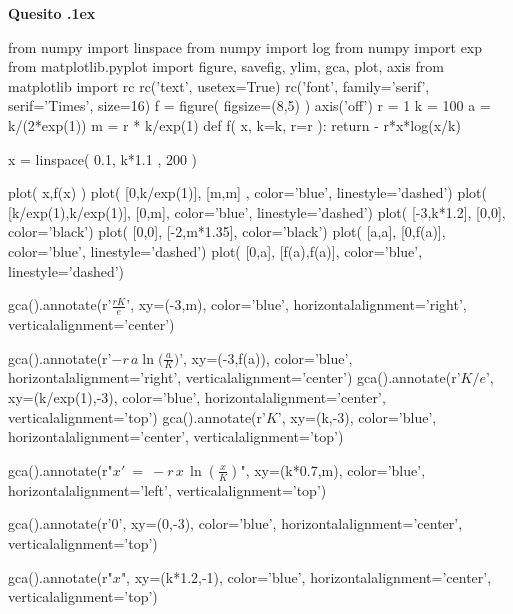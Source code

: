 \documentclass[11pt,twoside,a4paper]{article}
\newcounter{quesito}
\newenvironment{question}{\bigskip\addtocounter{quesito}{1}\bigskip\bigskip\par\textbf{Quesito \thequesito.\kern1ex}}{\vspace{\parskip}}
\begin{document}
\begin{question}
\begin{pycode}
from numpy import linspace
from numpy import log
from numpy import exp
from matplotlib.pyplot import figure, savefig, ylim, gca, plot, axis
from matplotlib import rc
rc('text', usetex=True)
rc('font', family='serif', serif='Times', size=16)
f = figure( figsize=(8,5) )
axis('off')
r = 1
k = 100
a = k/(2*exp(1))
m = r * k/exp(1)
def f( x, k=k, r=r ):
    return - r*x*log(x/k)

x   = linspace( 0.1, k*1.1 , 200 )


plot( x,f(x) )
plot( [0,k/exp(1)], [m,m] ,  color='blue', linestyle='dashed')
plot( [k/exp(1),k/exp(1)], [0,m], color='blue', linestyle='dashed')
plot(  [-3,k*1.2], [0,0], color='black')
plot(  [0,0], [-2,m*1.35], color='black')
plot( [a,a], [0,f(a)], color='blue', linestyle='dashed')
plot( [0,a], [f(a),f(a)], color='blue', linestyle='dashed')

gca().annotate(r'$\frac{rK}{e}$', 
                    xy=(-3,m), 
                    color='blue', 
                    horizontalalignment='right',  
                    verticalalignment='center')
                    
gca().annotate(r'$-r\,a\ln\!\big(\frac{a}{K}\big)$', 
                    xy=(-3,f(a)), 
                    color='blue', 
                    horizontalalignment='right',  
                    verticalalignment='center')
gca().annotate(r'$K/e$', 
                    xy=(k/exp(1),-3), 
                    color='blue', 
                    horizontalalignment='center',  
                    verticalalignment='top')
gca().annotate(r'$K$', 
                    xy=(k,-3), 
                    color='blue', 
                    horizontalalignment='center',  
                    verticalalignment='top')
                    
gca().annotate(r"$\displaystyle x'\ =\ - r\,x\,\ln\left(\frac{x}{K}\right)$", 
                    xy=(k*0.7,m), 
                    color='blue', 
                    horizontalalignment='left',  
                    verticalalignment='top') 
                    
gca().annotate(r'$0$', 
                    xy=(0,-3), 
                    color='blue', 
                    horizontalalignment='center',  
                    verticalalignment='top')        
           
gca().annotate(r"$x$", 
                    xy=(k*1.2,-1), 
                    color='blue', 
                    horizontalalignment='center',  
                    verticalalignment='top')                   
 

\end{pycode}
\end{question}
\end{document}
